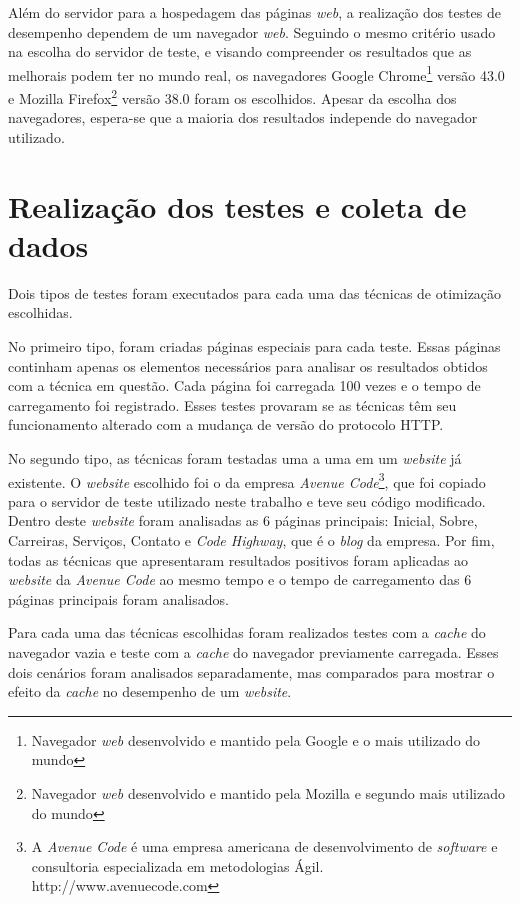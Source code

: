 Além do servidor para a hospedagem das páginas \textit{web}, a realização dos testes de desempenho dependem de um navegador \textit{web}. Seguindo o mesmo critério usado na escolha do servidor de teste, e visando compreender os resultados que as melhorais podem ter no mundo real, os navegadores Google Chrome\footnote{Navegador \textit{web} desenvolvido e mantido pela Google e o mais utilizado do mundo} versão 43.0 e Mozilla Firefox\footnote{Navegador \textit{web} desenvolvido e mantido pela Mozilla e segundo mais utilizado do mundo} versão 38.0 foram os escolhidos. Apesar da escolha dos navegadores, espera-se que a maioria dos resultados independe do navegador utilizado.

\section{Realização dos testes e coleta de dados}
\label{sec:realizacaodostestesecoletadedados}

Dois tipos de testes foram executados para cada uma das técnicas de otimização escolhidas.

No primeiro tipo, foram criadas páginas especiais para cada teste. Essas páginas continham apenas os elementos necessários para analisar os resultados obtidos com a técnica em questão. Cada página foi carregada 100 vezes e o tempo de carregamento foi registrado. Esses testes provaram se as técnicas têm seu funcionamento alterado com a mudança de versão do protocolo HTTP.

No segundo tipo, as técnicas foram testadas uma a uma em um \textit{website} já existente. O \textit{website} escolhido foi o da empresa \textit{Avenue Code}\footnote{A \textit{Avenue Code} é uma empresa americana de desenvolvimento de \textit{software} e consultoria especializada em metodologias Ágil. http://www.avenuecode.com}, que foi copiado para o servidor de teste utilizado neste trabalho e teve seu código modificado. Dentro deste \textit{website} foram analisadas as 6 páginas principais: Inicial, Sobre, Carreiras, Serviços, Contato e \textit{Code Highway}, que é o \textit{blog} da empresa. Por fim, todas as técnicas que apresentaram resultados positivos foram aplicadas ao \textit{website} da \textit{Avenue Code} ao mesmo tempo e o tempo de carregamento das 6 páginas principais foram analisados.

Para cada uma das técnicas escolhidas foram realizados testes com a \textit{cache} do navegador vazia e teste com a \textit{cache} do navegador previamente carregada. Esses dois cenários foram analisados separadamente, mas comparados para mostrar o efeito da \textit{cache} no desempenho de um \textit{website}.

